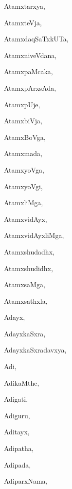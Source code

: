 \begin{multicols}{3}
{\noindent
{Atamxtarxya}, \pageref{Atamxtarxya}

\noindent
{AtamxteVja}, \pageref{AtamxteVja}

\noindent
{AtamxdaqSaTxkUTa}, \pageref{AtamxdaqSaTxkUTa}

\noindent
{AtamxniveVdana}, \pageref{AtamxniveVdana}

\noindent
{AtamxpaMcaka}, \pageref{AtamxpaMcaka}

\noindent
{AtamxpArxsAda}, \pageref{AtamxpArxsAda}

\noindent
{AtamxpUje}, \pageref{AtamxpUje}

\noindent
{AtamxbiVja}, \pageref{AtamxbiVja}

\noindent
{AtamxBoVga}, \pageref{AtamxBoVga}

\noindent
{Atamxmada}, \pageref{Atamxmada}

\noindent
{AtamxyoVga}, \pageref{AtamxyoVga}

\noindent
{AtamxyoVgi}, \pageref{AtamxyoVgi}

\noindent
{AtamxliMga}, \pageref{AtamxliMga}

\noindent
{AtamxvidAyx}, \pageref{AtamxvidAyx}

\noindent
{AtamxvidAyxliMga}, \pageref{AtamxvidAyxliMga}

\noindent
{Atamxshudadhx}, \pageref{Atamxshudadhx}

\noindent
{Atamxshudidhx}, \pageref{Atamxshudidhx}

\noindent
{AtamxsaMga}, \pageref{AtamxsaMga}

\noindent
{Atamxsathxla}, \pageref{Atamxsathxla}

\noindent
{Adayx}, \pageref{Adayx}

\noindent
{AdayxkaSxra}, \pageref{AdayxkaSxra}

\noindent
{AdayxkaSxradavxya}, \pageref{AdayxkaSxradavxya}

\noindent
{Adi}, \pageref{Adi}

\noindent
{AdikaMthe}, \pageref{AdikaMthe}

\noindent
{Adigati}, \pageref{Adigati}

\noindent
{Adiguru}, \pageref{Adiguru}

\noindent
{Aditayx}, \pageref{Aditayx}

\noindent
{Adipatha}, \pageref{Adipatha}

\noindent
{Adipada}, \pageref{Adipada}

\noindent
{AdiparxNama}, \pageref{AdiparxNama}

}
\end{multicols}
